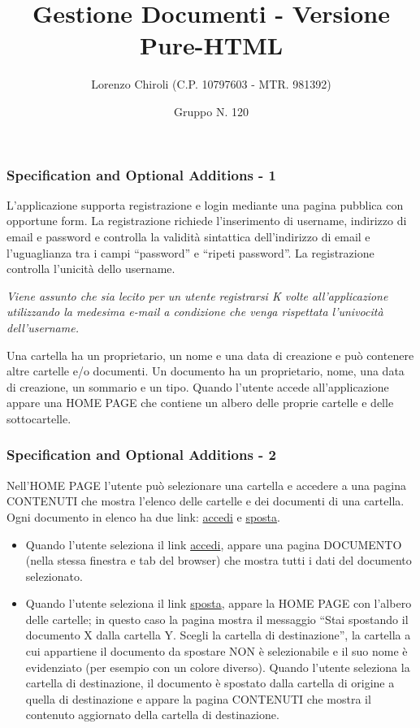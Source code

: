 \documentclass[aspectratio=169, dvipsnames]{beamer}
\title{Gestione Documenti - Versione Pure-HTML}
\author{Lorenzo Chiroli (C.P. 10797603 - MTR. 981392)}
\date{Gruppo N. 120}
\begin{document}
\frame{\titlepage}

\begin{frame}
    \frametitle{Specification and Optional Additions - 1}
    L’applicazione supporta registrazione e login mediante una pagina pubblica con opportune form. La registrazione
    richiede l’inserimento di username, indirizzo di email e password e controlla la validità sintattica dell’indirizzo
    di email e l’uguaglianza tra i campi “password” e “ripeti password”. La registrazione controlla l’unicità dello
    username. \newline

    \textit{Viene assunto che sia lecito per un utente registrarsi K volte all'applicazione utilizzando la medesima
        e-mail a condizione che venga rispettata l'univocità dell'username.} \newline

    Una cartella ha un proprietario, un nome e una data di creazione e può contenere altre cartelle e/o documenti. Un
    documento ha un proprietario, nome, una data di creazione, un sommario e un tipo. Quando l’utente accede
    all’applicazione appare una HOME PAGE che contiene un albero delle proprie cartelle e delle sottocartelle.
\end{frame}

\begin{frame}
    \frametitle{Specification and Optional Additions - 2}
    Nell’HOME PAGE l’utente può selezionare una cartella e accedere a una pagina CONTENUTI che mostra l’elenco delle
    cartelle e dei documenti di una cartella. Ogni documento in elenco ha due link: \underline{accedi} e
    \underline{sposta}.

    \begin{itemize}
        \item Quando l’utente seleziona il link \underline{accedi}, appare una pagina DOCUMENTO (nella stessa finestra
              e tab del browser) che mostra tutti i dati del documento selezionato.
        \item Quando l’utente seleziona il link \underline{sposta}, appare la HOME PAGE con l’albero delle cartelle; in
              questo caso la pagina mostra il messaggio “Stai spostando il documento X dalla cartella Y. Scegli la
              cartella di destinazione”, la cartella a cui appartiene il documento da spostare NON è selezionabile e il
              suo nome è evidenziato (per esempio con un colore diverso). Quando l’utente seleziona la cartella di
              destinazione, il documento è spostato dalla cartella di origine a quella di destinazione e appare la
              pagina CONTENUTI che mostra il contenuto aggiornato della cartella di destinazione.
    \end{itemize}
\end{frame}
\end{document}
